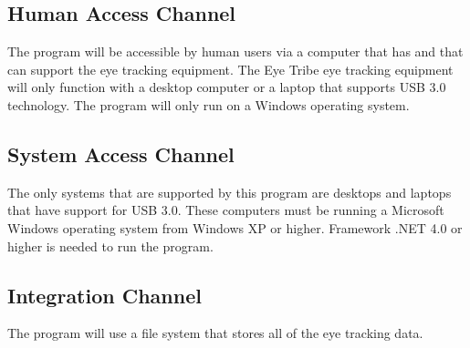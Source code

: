 

\subsection{Human Access Channel}
    The program will be accessible by human users via a computer that has and that can support the eye tracking equipment. The Eye Tribe eye tracking equipment will only function with a desktop computer or a laptop that supports USB 3.0 technology. The program will only run on a Windows operating system.
\subsection{System Access Channel}
    The only systems that are supported by this program are desktops and laptops that have support for USB 3.0. These computers must be running a Microsoft Windows operating system from Windows XP or higher. Framework .NET 4.0 or higher is needed to run the program.
\subsection{Integration Channel}
    The program will use a file system that stores all of the eye tracking data.
